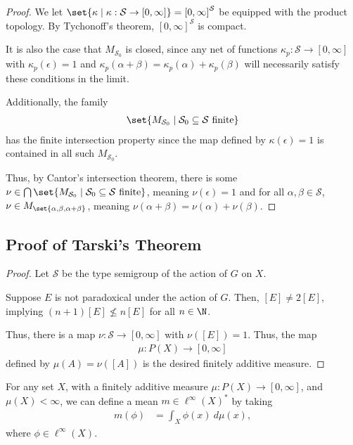 \documentclass[10pt]{mypackage}
\begin{document}
\begin{proof}
    We let $\set{\kappa\mid \kappa: \mathcal{S}\rightarrow [0,\infty]} = \left[0,\infty\right]^{\mathcal{S}}$ be equipped with the product topology. By Tychonoff's theorem, $\left[0,\infty\right]^{\mathcal{S}}$ is compact.\newline

    It is also the case that $M_{\mathcal{S}_0}$ is closed, since any net of functions $\kappa_{p}: \mathcal{S}\rightarrow [0,\infty]$ with $\kappa_{p}\left(\epsilon\right) = 1$ and $\kappa_{p}\left(\alpha + \beta\right) = \kappa_{p}\left(\alpha\right) + \kappa_{p}\left(\beta\right)$ will necessarily satisfy these conditions in the limit.\newline

    Additionally, the family
    \begin{align*}
      \set{M_{\mathcal{S}_0}\mid \mathcal{S}_0\subseteq \mathcal{S}\text{ finite}}
    \end{align*}
    has the finite intersection property since the map defined by $\kappa(\epsilon) = 1$ is contained in all such $M_{\mathcal{S}_0}$.\newline

    Thus, by Cantor's intersection theorem, there is some $\nu\in \bigcap\set{M_{\mathcal{S}_0}\mid \mathcal{S}_0\subseteq \mathcal{S}\text{ finite}}$, meaning $\nu\left(\epsilon\right) = 1$ and for all $\alpha,\beta \in \mathcal{S}$, $\nu \in M_{\set{\alpha,\beta,\alpha + \beta}}$, meaning $\nu\left(\alpha + \beta\right) = \nu\left(\alpha\right) + \nu\left(\beta\right)$.
  \end{proof}
  \subsection{Proof of Tarski's Theorem}%
  \begin{proof}
    Let $\mathcal{S}$ be the type semigroup of the action of $G$ on $X$.\newline

    Suppose $E$ is not paradoxical under the action of $G$. Then, $\left[E\right] \neq 2\left[E\right]$, implying $\left(n+1\right)\left[E\right]\nleq n\left[E\right]$ for all $n\in \N$.\newline

    Thus, there is a map $\nu: \mathcal{S} \rightarrow [0,\infty]$ with $\nu\left(\left[E\right]\right) = 1$. Thus, the map
    \begin{align*}
      \mu: P\left(X\right)\rightarrow [0,\infty]
    \end{align*}
    defined by $\mu\left(A\right) = \nu\left(\left[A\right]\right)$ is the desired finitely additive measure.
  \end{proof}
  For any set $X$, with a finitely additive measure $\mu: P\left(X\right)\rightarrow [0,\infty]$, and $\mu(X) < \infty$, we can define a mean $m\in \ell^{\infty}\left(X\right)^{\ast}$ by taking
  \begin{align*}
    m\left(\phi\right) &= \int_{X}^{} \phi(x)\:d\mu(x),
  \end{align*}
  where $\phi \in \ell^{\infty}\left(X\right)$.\newline
\end{document}
